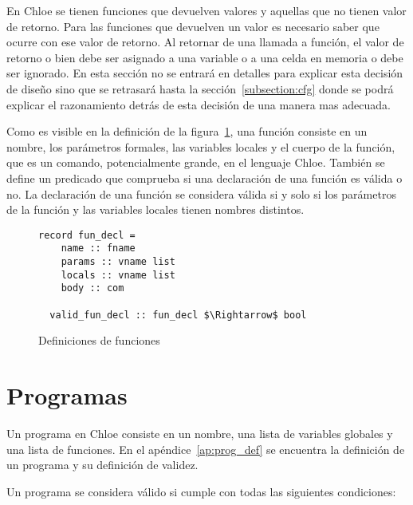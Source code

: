 En Chloe se tienen funciones que devuelven valores y aquellas que no tienen valor de retorno.
Para las funciones que devuelven un valor es necesario saber que ocurre con ese valor de retorno.
Al retornar de una llamada a función, el valor de retorno o bien debe ser asignado a una variable o a una celda en memoria o debe ser ignorado.
En esta sección no se entrará en detalles para explicar esta decisión de diseño sino que se retrasará hasta la sección~\ref{subsection:cfg} donde se podrá explicar el razonamiento detrás de esta decisión de una manera mas adecuada.

Como es visible en la definición de la figura~\ref{fig:fun_def}, una función consiste en un nombre, los parámetros formales, las variables locales y el cuerpo de la función, que es un comando, potencialmente grande, en el lenguaje Chloe.
También se define un predicado que comprueba si una declaración de una función es válida o no.
La declaración de una función se considera válida si y solo si los parámetros de la función y las variables locales tienen nombres distintos.

\begin{figure}
  \begin{lstlisting}[frame=single, mathescape=true]
  record fun_decl =
    name :: fname
    params :: vname list
    locals :: vname list
    body :: com

  valid_fun_decl :: fun_decl $\Rightarrow$ bool
  \end{lstlisting}

  \caption{Definiciones de funciones}
  \label{fig:fun_def}
\end{figure}

\section{Programas}\label{section:programs_commands}

Un programa en Chloe consiste en un nombre, una lista de variables globales y una lista de funciones.
En el apéndice~\ref{ap:prog_def} se encuentra la definición de un programa y su definición de validez.

Un programa se considera válido si cumple con todas las siguientes condiciones:

